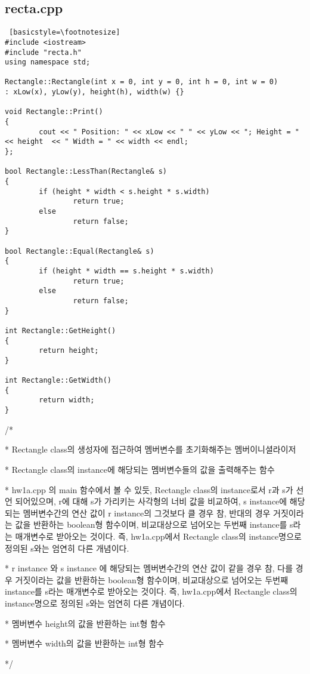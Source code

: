 \documentclass[twoside,twocolumn]{article}
\newenvironment{itemizeReduced}{
\begin{list}{\labelitemi}{\leftmargin=1em}
\setlength{\itemsep}{1pt}
\setlength{\parskip}{0pt}
\setlength{\parsep}{0pt}}{\end{list}
}
\begin{document}
\subsection{recta.cpp}
\begin{lstlisting} [basicstyle=\footnotesize]
#include <iostream>
#include "recta.h"
using namespace std;

Rectangle::Rectangle(int x = 0, int y = 0, int h = 0, int w = 0)
: xLow(x), yLow(y), height(h), width(w) {}

void Rectangle::Print()
{
        cout << " Position: " << xLow << " " << yLow << "; Height = " << height  << " Width = " << width << endl;
};

bool Rectangle::LessThan(Rectangle& s)
{
        if (height * width < s.height * s.width)
                return true;
        else
                return false;
}

bool Rectangle::Equal(Rectangle& s)
{
        if (height * width == s.height * s.width)
                return true;
        else
                return false;
}

int Rectangle::GetHeight()
{
        return height;
}

int Rectangle::GetWidth()
{
        return width;
}
\end{lstlisting}
\newpage
\begin{itemizeReduced}
    \item[/*]
    \item[*] Rectangle class의 생성자에 접근하여 멤버변수를 초기화해주는 멤버이니셜라이저
    \item[*] Rectangle class의 instance에 해당되는 멤버변수들의 값을 출력해주는 함수
    \item[*] hw1a.cpp 의 main 함수에서 볼 수 있듯, Rectangle class의 instance로서 r과 s가 선언 되어있으며, r에 대해 s가 가리키는 사각형의 너비 값을 비교하여, s instance에 해당되는 멤버변수간의 연산 값이  r instance의 그것보다 클 경우 참, 반대의 경우 거짓이라는 값을 반환하는 boolean형 함수이며, 비교대상으로 넘어오는 두번째 instance를  s라는 매개변수로 받아오는 것이다. 즉, hw1a.cpp에서 Rectangle class의 instance명으로 정의된 s와는 엄연히 다른 개념이다.
    \item[*] r instance 와 s instance 에 해당되는 멤버변수간의 연산 값이 같을 경우 참, 다를 경우 거짓이라는 값을 반환하는 boolean형 함수이며, 비교대상으로 넘어오는 두번째 instance를  s라는 매개변수로 받아오는 것이다. 즉, hw1a.cpp에서 Rectangle class의 instance명으로 정의된 s와는 엄연히 다른 개념이다.
    \item[*] 멤버변수 height의 값을 반환하는 int형 함수
    \item[*] 멤버변수 width의 값을 반환하는 int형 함수
\end{itemizeReduced}
*/
\end{document}
